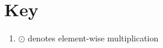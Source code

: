 \chapter*{Key}

\begin{enumerate}
    \item $\odot$ denotes element-wise multiplication
\end{enumerate}